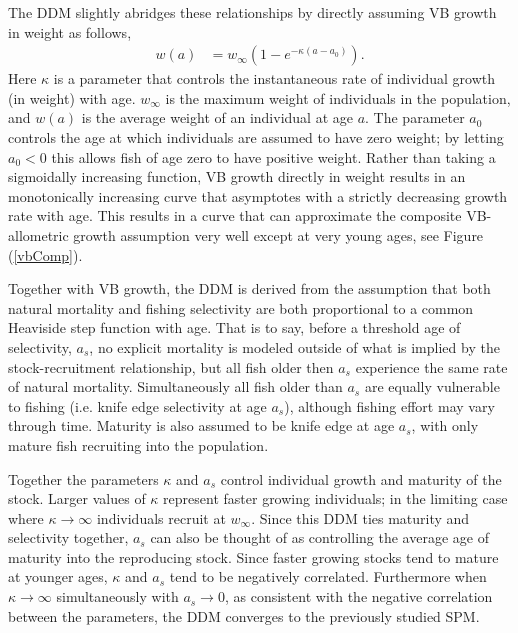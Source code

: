 %
The DDM slightly abridges these relationships by directly assuming VB
growth in weight as follows,
%
\begin{align}
w(a) &= w_\infty(1-e^{-\kappa (a-a_0)}). \label{vbGrowth}
\end{align}
%
Here $\kappa$ is a parameter that controls the instantaneous rate of individual
growth (in weight) with age. $w_\infty$ is the maximum weight of individuals
in the population, and $w(a)$ is the average weight of an individual at
age $a$. The parameter $a_0$ controls the age at which individuals are assumed
to have zero weight; by letting $a_0<0$ this allows fish of age zero to have
positive weight. Rather than taking a sigmoidally increasing function, VB growth
directly in weight results in an monotonically increasing curve that asymptotes
with a strictly decreasing growth rate with age. This results in a curve that
can approximate the composite VB-allometric growth assumption very well except 
at very young ages, see Figure (\ref{vbComp}).

%
Together with VB growth, the DDM is derived from the assumption that
both natural mortality and fishing selectivity are both proportional %
to a common Heaviside step function with age. That is to say, before a threshold
age of selectivity, $a_s$, no explicit mortality is modeled outside of what is 
implied by the stock-recruitment relationship,
but all fish older then $a_s$ experience the same rate
of natural mortality. Simultaneously all fish older than $a_s$ are equally
vulnerable to fishing (i.e. knife edge selectivity at age $a_s$), although
fishing effort may vary through time. Maturity is also assumed to be knife edge at age $a_s$, with only 
mature fish recruiting into the population.

%
Together the parameters $\kappa$ and $a_s$ control individual growth and 
maturity of the stock. Larger values of $\kappa$ represent faster growing 
individuals; in the limiting case where $\kappa\to\infty$ individuals recruit 
at $w_\infty$. Since this DDM ties maturity and selectivity together, $a_s$ can 
also be thought of as controlling the average age of maturity into the reproducing 
stock. Since faster growing stocks tend to mature at younger ages, $\kappa$ 
and $a_s$ tend to be negatively correlated. Furthermore when $\kappa\to\infty$ simultaneously 
with $a_s\to0$, as consistent with the negative correlation between the parameters, 
the DDM converges to the previously studied SPM.

